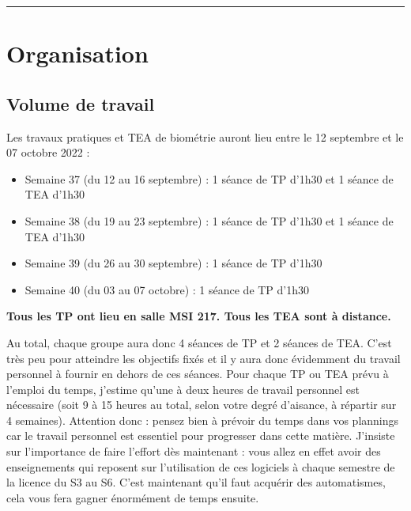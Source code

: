 \documentclass[
  letterpaper,
  DIV=11,
  numbers=noendperiod]{scrreprt}
\providecommand{\tightlist}{%
  \setlength{\itemsep}{0pt}\setlength{\parskip}{0pt}}\usepackage{longtable,booktabs,array}
\begin{document}
\begin{center}\rule{0.5\linewidth}{0.5pt}\end{center}

\hypertarget{organisation}{%
\section*{Organisation}\label{organisation}}

\hypertarget{volume-de-travail}{%
\subsection*{Volume de travail}\label{volume-de-travail}}

Les travaux pratiques et TEA de biométrie auront lieu entre le 12
septembre et le 07 octobre 2022 :

\begin{itemize}
\tightlist
\item
  Semaine 37 (du 12 au 16 septembre) : 1 séance de TP d'1h30 et 1 séance
  de TEA d'1h30
\item
  Semaine 38 (du 19 au 23 septembre) : 1 séance de TP d'1h30 et 1 séance
  de TEA d'1h30
\item
  Semaine 39 (du 26 au 30 septembre) : 1 séance de TP d'1h30
\item
  Semaine 40 (du 03 au 07 octobre) : 1 séance de TP d'1h30
\end{itemize}

\textbf{Tous les TP ont lieu en salle MSI 217. Tous les TEA sont à
distance.}

Au total, chaque groupe aura donc 4 séances de TP et 2 séances de TEA.
C'est très peu pour atteindre les objectifs fixés et il y aura donc
évidemment du travail personnel à fournir en dehors de ces séances. Pour
chaque TP ou TEA prévu à l'emploi du temps, j'estime qu'une à deux
heures de travail personnel est nécessaire (soit 9 à 15 heures au total,
selon votre degré d'aisance, à répartir sur 4 semaines). Attention donc
: pensez bien à prévoir du temps dans vos plannings car le travail
personnel est essentiel pour progresser dans cette matière. J'insiste
sur l'importance de faire l'effort dès maintenant : vous allez en effet
avoir des enseignements qui reposent sur l'utilisation de ces logiciels
à chaque semestre de la licence du S3 au S6. C'est maintenant qu'il faut
acquérir des automatismes, cela vous fera gagner énormément de temps
ensuite.
\end{document}
